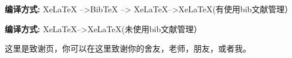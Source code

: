 \documentclass{LZUthesis}
\begin{document}
{\bfseries 编译方式:}  XeLaTeX -->BibTeX --> XeLaTeX-->XeLaTeX(有使用bib文献管理）

{\bfseries 编译方式:}  XeLaTeX-->XeLaTeX(未使用bib文献管理）


\Thanks
这里是致谢页，你可以在这里致谢你的舍友，老师，朋友，或者我。





\Grade
\end{document}
